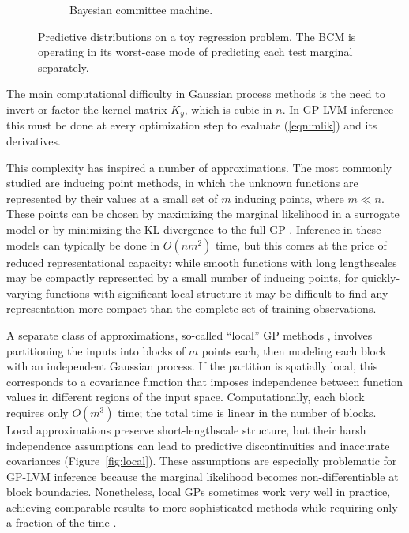 \documentclass{article}
\begin{document}
\begin{figure}
\begin{subfigure}[t]{.30\textwidth}
  \caption{Bayesian committee machine.}
  \label{fig:bcm}
\end{subfigure}
\caption{Predictive distributions on a toy regression problem. The BCM
is operating in its worst-case mode of predicting each test marginal
separately.}
\label{fig:approx}
\end{figure}

The main computational difficulty in Gaussian process methods is
the need to invert or factor the kernel matrix $K_y$, which is cubic
in $n$. In GP-LVM inference this must be done at every optimization step to evaluate
(\ref{eqn:mlik}) and its derivatives.

This complexity has inspired
a number of approximations. The most commonly studied are inducing
point methods, in which the unknown functions are
represented by their values at a small set of $m$ inducing
points, where $m \ll n$. These points can be chosen by maximizing the marginal
likelihood in a surrogate model \citep{quinonero2005, lawrence2007learning} or by
minimizing the KL divergence to the full GP
\citep{titsias2009variational}. Inference in these models can
typically be done in $O(nm^2)$ time, but this comes at the price
of reduced representational capacity: while smooth functions with long lengthscales may
be compactly represented by a small number of inducing points, for
quickly-varying functions with significant local
structure it may be difficult to find any representation more compact
than the complete set of training observations.

A separate class of approximations, so-called ``local'' GP methods
\cite{rasmussen2006, nguyen2009model, zhao2011human, park2011domain}, involves
partitioning the inputs into blocks of $m$ points each, then modeling
each block with an independent Gaussian process. If the partition is
spatially local, this corresponds to a covariance function that imposes independence
between function values in different regions of the input
space. Computationally, each block requires only $O(m^3)$ time; the
total time is linear in the number of blocks. Local approximations
preserve short-lengthscale structure, but their harsh independence assumptions can lead to
predictive discontinuities and inaccurate covariances
(Figure~\ref{fig:local}). These assumptions are especially problematic for
GP-LVM inference because the marginal likelihood becomes
non-differentiable at block boundaries. Nonetheless, local GPs sometimes
work very well in practice, achieving comparable results to more
sophisticated methods while requiring only a fraction of the time \cite{chalupka2012}.
\end{document}
